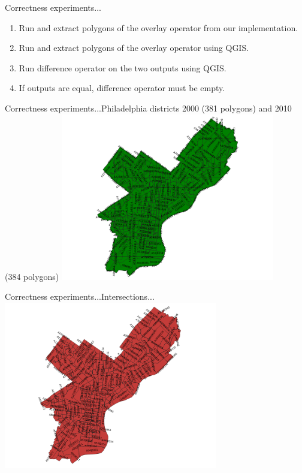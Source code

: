 \documentclass{beamer}
\begin{document}
\begin{frame}{Correctness experiments...}
    \begin{enumerate}
        \item Run and extract polygons of the overlay operator from our implementation.
        \item Run and extract polygons of the overlay operator using QGIS.
        \item Run difference operator on the two outputs using QGIS.
        \item If outputs are equal, difference operator must be empty.
    \end{enumerate}
\end{frame}
\begin{frame}{Correctness experiments...}{Philadelphia districts 2000 (381 polygons) and 2010 (384 polygons)}
    \centering
	\includegraphics[trim=1cm 0 1cm 0, clip, width=0.7\textwidth]{figures/06-Correctness/Phili_Faces}
\end{frame}
\begin{frame}{Correctness experiments...}{Intersections...}
    \centering
	\includegraphics[trim=1cm 0 1cm 0, clip, width=0.7\textwidth]{figures/06-Correctness/Phili_Intersections}
\end{frame}
\end{document}
